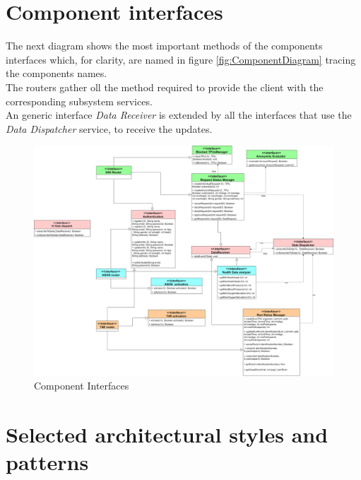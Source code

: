 \section{Component interfaces}
The next diagram shows the most important methods of the components interfaces which, for clarity, are named in figure \ref{fig:ComponentDiagram} tracing the components names.\\
The routers gather oll the method required to provide the client with the corresponding subsystem services. \\
An generic interface \textit{Data Receiver} is extended by all the interfaces that use the \textit{Data Dispatcher} service, to receive the updates.
\begin{figure}[H]
\caption{Component Interfaces}
\centering
\includegraphics[width = \textwidth]{sections/architecturalDesign/componentInterfaces.png}
\end{figure}
\section{Selected architectural styles and patterns}
